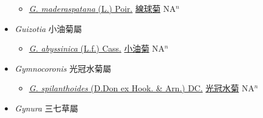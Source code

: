 \begin{itemize}
  \begin{itemize}
        \item[] \href{http://www.theplantlist.org/tpl1.1/search?q=Grangea+maderaspatana}{\textit{G. maderaspatana} (L.) Poir.}   \href{\detokenize{http://taibnet.sinica.edu.tw/chi/taibnet_species_list.php?T2=線球菊&T2_new_value=true&fr=y}}{線球菊} NA$^n$
  \end{itemize}
 \item[] \textit{Guizotia} 小油菊屬
                    
  \begin{itemize}
        \item[] \href{http://www.theplantlist.org/tpl1.1/search?q=Guizotia+abyssinica}{\textit{G. abyssinica} (L.f.) Cass.}   \href{\detokenize{http://taibnet.sinica.edu.tw/chi/taibnet_species_list.php?T2=小油菊&T2_new_value=true&fr=y}}{小油菊} NA$^n$
  \end{itemize}
 \item[] \textit{Gymnocoronis} 光冠水菊屬
                    
  \begin{itemize}
        \item[] \href{http://www.theplantlist.org/tpl1.1/search?q=Gymnocoronis+spilanthoides}{\textit{G. spilanthoides} (D.Don ex Hook. \& Arn.) DC.}   \href{\detokenize{http://taibnet.sinica.edu.tw/chi/taibnet_species_list.php?T2=光冠水菊&T2_new_value=true&fr=y}}{光冠水菊} NA$^n$
  \end{itemize}
 \item[] \textit{Gynura} 三七草屬
                    

\end{itemize}
